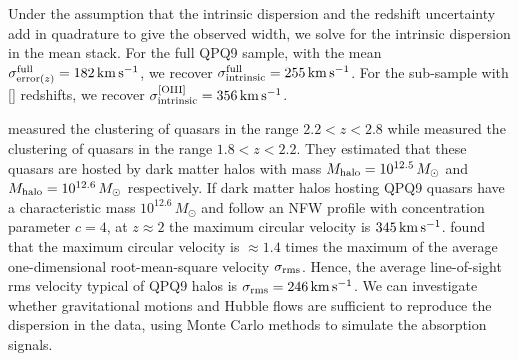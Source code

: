\documentclass[iop]{emulateapj}
\begin{document}
Under the assumption that the intrinsic dispersion and the redshift uncertainty add in 
quadrature to give the observed width, we solve for the intrinsic dispersion in the  
mean stack. For the full QPQ9 sample, with the mean 
$\sigma_{{\rm error}(z)}^{\rm full}=182\,{\rm km\,s^{-1}}$, we recover 
$\sigma_{\rm intrinsic}^{\rm full}=255\,{\rm km\,s^{-1}}$. For the sub-sample with [] 
redshifts, we recover $\sigma_{\rm intrinsic}^{\rm [OIII]}=356\,{\rm km\,s^{-1}}$. 

\cite{Eftekharzadeh+15} measured the clustering of quasars in the range $2.2<z<2.8$ while 
\cite{RodriguezTorres+17} measured the clustering of quasars in the range $1.8<z<2.2$. They 
estimated that these quasars are hosted by dark matter halos with mass 
$M_{\rm halo}=10^{12.5}\,M_\odot$ and $M_{\rm halo}=10^{12.6}\,M_\odot$ respectively. If dark
matter halos hosting QPQ9 quasars have a characteristic mass $10^{12.6}\,M_\odot$ and follow an 
NFW profile \citep{NavarroFrenkWhite97} with concentration parameter $c=4$, at $z\approx2$ the
maximum circular velocity is $345\,{\rm km\,s^{-1}}$. \cite{TormenBouchetWhite97} found that the
maximum circular velocity is $\approx1.4$ times the maximum of the average one-dimensional
root-mean-square velocity $\sigma_{\rm rms}$. Hence, the average line-of-sight rms velocity
typical of QPQ9 halos is $\sigma_{\rm rms}=246\,{\rm km\,s^{-1}}$. We can investigate
whether gravitational motions and Hubble flows are sufficient to reproduce the dispersion in the
data, using Monte Carlo methods to simulate the absorption signals.
\end{document}
